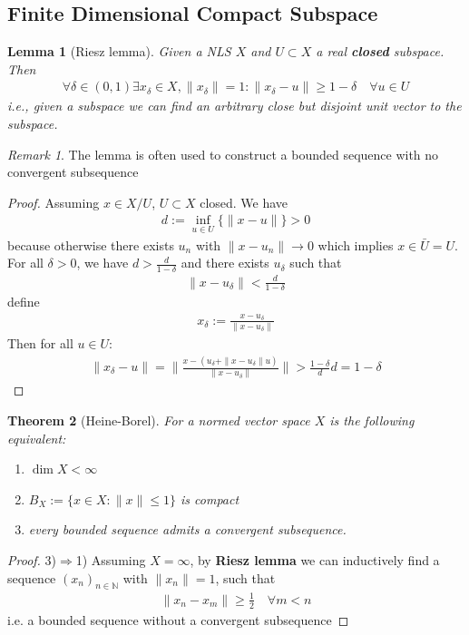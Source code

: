 \documentclass[a4paper,11pt,fleqn]{book}
\newtheorem{theorem}{Theorem}[section]
\newtheorem{lemma}[theorem]{Lemma}
\theoremstyle{definition}
\theoremstyle{remark}
\newtheorem*{remark}{Remark}
\begin{document}
\subsection{Finite Dimensional Compact Subspace}
\begin{lemma}[Riesz lemma]
	Given a NLS $X$ and $U \subset X$ a real \textbf{closed} subspace. Then
	\begin{align*}
		\forall \delta \in (0, 1)\exists x_\delta \in X, \|x_\delta\| = 1: \|x_\delta - u\| \ge 1 - \delta \quad \forall u \in U
	\end{align*}
	i.e., given a subspace we can find an arbitrary close but disjoint unit vector to the subspace.
\end{lemma}
\begin{remark}
	The lemma is often used to construct a bounded sequence with no convergent subsequence
\end{remark}
\begin{proof}
	Assuming $x \in X\slash U$, $U \subset X$ closed. We have 
	\begin{align*}
		d:= \inf_{u \in U}\{\|x - u\|\} > 0
	\end{align*}
	because otherwise there exists $u_n$ with $\|x - u_n\| \rightarrow 0$ which implies $x \in \bar{U} = U$. For all $\delta > 0$, we have $d > \frac{d}{1 - \delta}$ and there exists $u_\delta$ such that
	\begin{align*}
		\|x - u_\delta\| < \frac{d}{1 - \delta}
	\end{align*}
	define 
	\begin{align*}
		x_\delta := \frac{x - u_\delta}{\|x - u_\delta\|}
	\end{align*}
	Then for all $u \in U$:
	\begin{align*}
		\|x_\delta - u\| = \bigg\| \frac{x - (u_\delta + \|x - u_\delta\| u) }{\|x - u_\delta\|} \bigg\| > \frac{1- \delta}{d} d = 1 - \delta
	\end{align*}
\end{proof}

\begin{theorem}[Heine-Borel]
For a normed vector space $X$ is the following equivalent:
\begin{enumerate}
	\item $\dim X < \infty$
	\item $B_X:= \{x \in X: \|x\| \le  1\}$ is compact
	\item every bounded sequence admits a convergent subsequence.
\end{enumerate}
\end{theorem}
\begin{proof}
	3)$\Rightarrow$1) Assuming $X = \infty$, by \textbf{Riesz lemma} we can inductively find a sequence $(x_n)_{n \in \mathbb{N}}$ with $\|x_n\| = 1$, such that 
	\begin{align*}
		\|x_n - x_m\| \ge \frac{1}{2} \quad \forall m < n
	\end{align*}
	i.e. a bounded sequence without a convergent subsequence
\end{proof}
\end{document}
